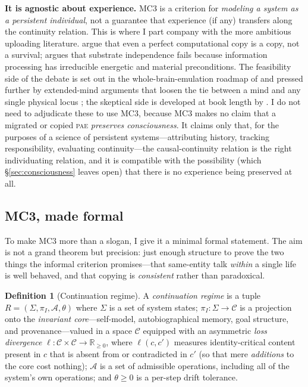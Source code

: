 \documentclass[11pt,a4paper]{article}
\theoremstyle{definition}
\newtheorem{definition}{Definition}
\newcommand{\pae}{\textsc{pae}\xspace}
\begin{document}
\textbf{It is agnostic about experience.} MC3 is a criterion for \emph{modeling a system as a persistent individual}, not a guarantee that experience (if any) transfers along the continuity relation. This is where I part company with the more ambitious uploading literature. \citet{corabi2012uploading} argue that even a perfect computational copy is a copy, not a survival; \citet{thagard2022} argues that substrate independence fails because information processing has irreducible energetic and material preconditions. The feasibility side of the debate is set out in the whole-brain-emulation roadmap of \citet{sandberg2008wbe} and pressed further by extended-mind arguments that loosen the tie between a mind and any single physical locus \citep{clarkchalmers1998}; the skeptical side is developed at book length by \citet{schneider2019}. I do not need to adjudicate these to use MC3, because MC3 makes no claim that a migrated or copied \pae{} \emph{preserves consciousness}. It claims only that, for the purposes of a science of persistent systems---attributing history, tracking responsibility, evaluating continuity---the causal-continuity relation is the right individuating relation, and it is compatible with the possibility (which \S\ref{sec:consciousness} leaves open) that there is no experience being preserved at all.

\subsection{MC3, made formal}

To make MC3 more than a slogan, I give it a minimal formal statement. The aim is not a grand theorem but precision: just enough structure to prove the two things the informal criterion promises---that same-entity talk \emph{within} a single life is well behaved, and that copying is \emph{consistent} rather than paradoxical.

\begin{definition}[Continuation regime]
A \emph{continuation regime} is a tuple $R=(\Sigma,\pi_I,\mathcal{A},\theta)$ where $\Sigma$ is a set of system states; $\pi_I:\Sigma\to\mathcal{C}$ is a projection onto the \emph{invariant core}---self-model, autobiographical memory, goal structure, and provenance---valued in a space $\mathcal{C}$ equipped with an asymmetric \emph{loss divergence} $\ell:\mathcal{C}\times\mathcal{C}\to\mathbb{R}_{\ge 0}$, where $\ell(c,c')$ measures identity-critical content present in $c$ that is absent from or contradicted in $c'$ (so that mere \emph{additions} to the core cost nothing); $\mathcal{A}$ is a set of admissible operations, including all of the system's own operations; and $\theta\ge 0$ is a per-step drift tolerance.
\end{definition}
\end{document}
